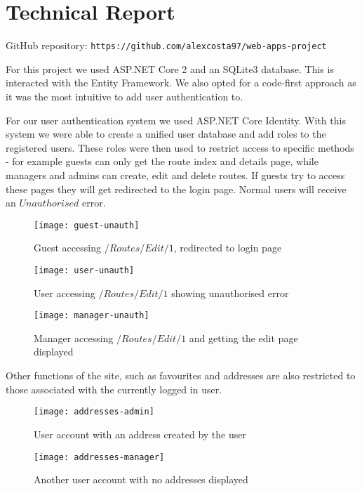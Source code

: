 \chapter{Technical Report}

GitHub repository: \texttt{https://github.com/alexcosta97/web-apps-project}

For this project we used ASP.NET Core 2 and an SQLite3 database. This is
interacted with the Entity Framework. We also opted for a code-first approach as
 it was the most intuitive to add user authentication to.

For our user authentication system we used ASP.NET Core Identity. With this
system we were able to create a unified user database and add roles to the
registered users. These roles were then used to restrict access to specific
methods - for example guests can only get the route index and details page,
while managers and admins can create, edit and delete routes. If guests try to
access these pages they will get redirected to the login page. Normal users will
receive an $Unauthorised$ error.

\begin{figure}[ht]
  \centering
  \texttt{[image: guest-unauth]}
  \caption{Guest accessing $/Routes/Edit/1$, redirected to login page}
\end{figure}

\begin{figure}[ht]
  \centering
  \texttt{[image: user-unauth]}
  \caption{User accessing $/Routes/Edit/1$ showing unauthorised error}
\end{figure}

\begin{figure}[ht]
  \centering
  \texttt{[image: manager-unauth]}
  \caption{Manager accessing $/Routes/Edit/1$ and getting the edit page displayed}
\end{figure}

\clearpage
Other functions of the site, such as favourites and addresses are also restricted
to those associated with the currently logged in user.

\begin{figure}[ht]
  \centering
  \texttt{[image: addresses-admin]}
  \caption{User account with an address created by the user}
\end{figure}

\begin{figure}[ht]
  \centering
  \texttt{[image: addresses-manager]}
  \caption{Another user account with no addresses displayed}
\end{figure}

